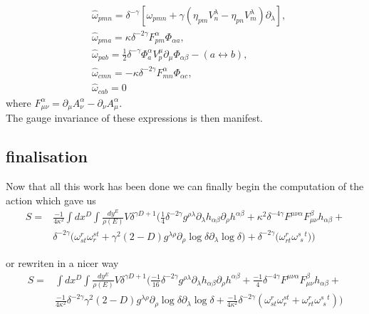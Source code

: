 \documentclass{article}
\begin{document}
\begin{subequations}\label{eq:14}
\begin{align}
&\hat\omega_{pmn} = \delta^{-\gamma}[\omega_{pmn}+ \gamma(\eta_{pm}V^{\lambda}_n-\eta_{pn}V^{\lambda}_m)\partial_{\lambda}],\\
&\hat \omega_{pma} = \kappa \delta^{-2 \gamma}F^{\alpha}_{pm}\Phi_{\alpha a},\\
&\hat\omega_{pab} = \frac{1}{2}\delta^{-\gamma}\Phi^\alpha_aV^\mu_p\partial_\mu\Phi_{\alpha \beta} - (a \leftrightarrow b),\\
&\hat\omega_{cmn} = -\kappa \delta^{-2 \gamma}F^{\alpha}_{mn}\Phi_{\alpha c},\\
&\hat \omega_{cab}  = 0
\end{align}
\end{subequations}
where $F^{\alpha}_{\mu \nu} = \partial_\mu A^\alpha_\nu - \partial_\nu A^\alpha_\mu$.\\ 
The gauge invariance of these expressions is then manifest.
\subsection{finalisation}
Now that all this work has been done we can finally begin the computation of the action which gave us
\begin{equation*}
    \begin{aligned}
    S = &\frac{-1}{4 \kappa^2}\int d x^D \int \frac{d y ^E}{\rho(E)} V \delta^{\gamma D +1}\Big(
    \frac{1}{4} \delta^{-2\gamma} g^{\rho \lambda} \partial_\lambda h_{\alpha \beta}\partial_\rho h^{\alpha \beta}
    +\kappa^2 \delta^{-4 \gamma}F^{\mu \nu \alpha}F^{\beta}_{\mu  \nu}h_{\alpha \beta}+\\
    &\delta^{-2 \gamma}\big(\omega^{r}_{st}\omega^{st}_r+ \gamma^{2}(2-D)g^{\lambda \rho}\partial_{\rho}\log{\delta}\partial_{\lambda}\log{\delta}\big) 
    + \delta^{-2 \gamma}\big( \omega^r_{rt} \omega^{s \, \, \, t}_{\, \, s} \big)\Big)
\end{aligned}
\end{equation*}

or rewriten in a nicer way
\begin{equation*}
    \begin{aligned}
    S = &\int d x^D \int \frac{d y ^E}{\rho(E)}V \delta^{\gamma D +1}( 
    \frac{-1}{16} \delta^{-2\gamma} g^{\rho \lambda} \partial_\lambda h_{\alpha \beta}\partial_\rho h^{\alpha \beta}
    +\frac{-1}{4}\delta^{-4 \gamma}F^{\mu \nu \alpha}F^{\beta}_{\mu  \nu}h_{\alpha \beta}+\\
    &\frac{-1}{4 \kappa^2}\delta^{-2 \gamma}\gamma^{2}(2-D)g^{\lambda \rho}\partial_{\rho}\log{\delta}\partial_{\lambda}\log{\delta} 
    + \frac{-1}{4 \kappa^2}\delta^{-2 \gamma}(\omega^{r}_{st}\omega^{st}_r +\omega^r_{rt} \omega^{s \, \, \, t}_{\, \, s}) )
\end{aligned}
\end{equation*}
\end{document}
